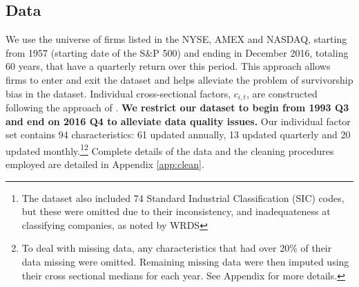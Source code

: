 \documentclass{article}
\begin{document}
\subsection{Data}
We use the universe of firms listed in the NYSE, AMEX and NASDAQ, starting from 1957 (starting date of the S\&P 500) and ending in December 2016, totaling 60 years, that have a quarterly return over this period. This approach allows firms to enter and exit the dataset and helps alleviate the problem of survivorship bias in the dataset. Individual cross-sectional factors, $c_{i,t}$, are constructed following the approach of \cite{gu_empirical_2018}. \textbf{We restrict our dataset to begin from 1993 Q3 and end on 2016 Q4 to alleviate data quality issues.} Our individual factor set contains 94 characteristics: 61 updated annually, 13 updated quarterly and 20 updated monthly.\footnote{The dataset also included 74 Standard Industrial Classification (SIC) codes, but these were omitted due to their inconsistency, and inadequateness at classifying companies, as noted by WRDS}\footnote{To deal with missing data, any characteristics that had over 20\% of their data missing were omitted. Remaining missing data were then imputed using their cross sectional medians for each year. See Appendix for more details.} Complete details of the data and the cleaning procedures employed are detailed in Appendix \ref{app:clean}.

\end{document}
